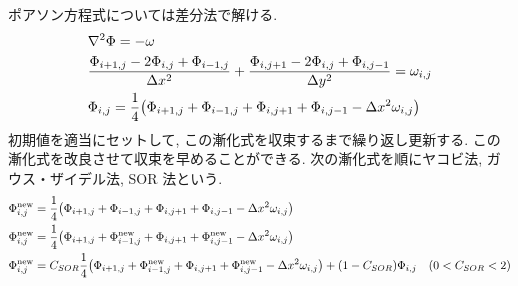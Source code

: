 \documentclass[a4paper,dvipdfmx]{jsarticle}
\theoremstyle{definition}
\begin{document}
ポアソン方程式については差分法で解ける.
\begin{align}
   & \laplacian\Phi = - \omega                                                                                                                  \\
   & \frac{\Phi_{i+1,j} - 2\Phi_{i,j} + \Phi_{i-1,j}}{\Delta x^2} + \frac{\Phi_{i,j+1} - 2\Phi_{i,j} + \Phi_{i,j-1}}{\Delta y^2} = \omega_{i,j} \\
   & \Phi_{i,j} = \frac{1}{4}\qty(\Phi_{i+1,j} + \Phi_{i-1,j} + \Phi_{i,j+1} + \Phi_{i,j-1} - \Delta x^2\omega_{i,j})
\end{align}
初期値を適当にセットして, この漸化式を収束するまで繰り返し更新する. この漸化式を改良させて収束を早めることができる. 次の漸化式を順にヤコビ法, ガウス・ザイデル法, SOR 法という.
\begin{align}
  \Phi_{i,j}^{\mathrm{new}} & = \frac{1}{4}\qty(\Phi_{i+1,j} + \Phi_{i-1,j} + \Phi_{i,j+1} + \Phi_{i,j-1} - \Delta x^2\omega_{i,j})                                                                                    \\
  \Phi_{i,j}^{\mathrm{new}} & = \frac{1}{4}\qty(\Phi_{i+1,j} + \Phi_{i-1,j}^{\mathrm{new}} + \Phi_{i,j+1} + \Phi_{i,j-1}^{\mathrm{new}} - \Delta x^2\omega_{i,j})                                                      \\
  \Phi_{i,j}^{\mathrm{new}} & = C_{SOR}\frac{1}{4}\qty(\Phi_{i+1,j} + \Phi_{i-1,j}^{\mathrm{new}} + \Phi_{i,j+1} + \Phi_{i,j-1}^{\mathrm{new}} - \Delta x^2\omega_{i,j}) + (1 - C_{SOR})\Phi_{i,j} & (0 < C_{SOR} < 2)
\end{align}
\end{document}
